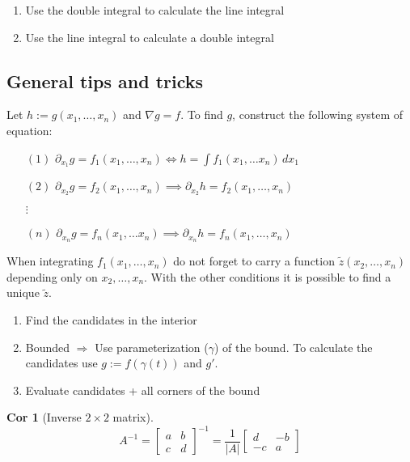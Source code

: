 \documentclass[a4paper, 10pt]{article}
\newtheorem*{corollary}{Cor}
\theoremstyle{definition}
\begin{document}
\begin{note*}
    \begin{enumerate}
        \item Use the double integral to calculate the line integral
        \item Use the line integral to calculate a double integral
    \end{enumerate}
\end{note*}

\pagebreak
\subsection*{General tips and tricks}
\begin{note*}
    Let \(h:=g(x_1, \dots, x_n)\) and \(\nabla g = f\).
    To find \(g\), construct the following system of equation:
    \begin{itemize}
        \item[\((1)\)] \(\partial_{x_1} g = f_1(x_1, \ldots, x_n) \iff h = \int f_1(x_1, \ldots x_n) \,dx_1\)
        \item[\((2)\)] \(\partial_{x_2} g = f_2(x_1, \ldots, x_n) \implies \partial_{x_2} h = f_2(x_1, \ldots, x_n)\)
        \item[\(\vdots\)]
        \item[\((n)\)]  \(\partial_{x_n} g = f_n(x_1, \ldots x_n) \implies \partial_{x_n} h = f_n(x_1, \ldots, x_n)\)
    \end{itemize}
    When integrating \(f_1(x_1, \dots, x_n)\) do not forget to carry a function \(\tilde{z}(x_2, \ldots, x_n)\) depending only on \(x_2, \ldots, x_n\). With the other conditions it is possible to find a unique \(\tilde{z}\).
\end{note*}

\begin{note*}
    \begin{enumerate}
        \item Find the candidates in the interior
        \item Bounded \(\Rightarrow\) Use parameterization (\(\gamma\)) of the bound. To calculate the candidates use \(g := f(\gamma(t))\) and \(g'\).
        \item Evaluate candidates + all corners of the bound
    \end{enumerate}
\end{note*}

\begin{corollary}[Inverse \(2 \times 2\) matrix]
    \[A^{-1} = \begin{bmatrix}
        a & b \\
        c & d
    \end{bmatrix}^{-1} = \frac{1}{|A|} \begin{bmatrix}
        d & -b \\
        -c & a
    \end{bmatrix}\]
\end{corollary}
\end{document}
